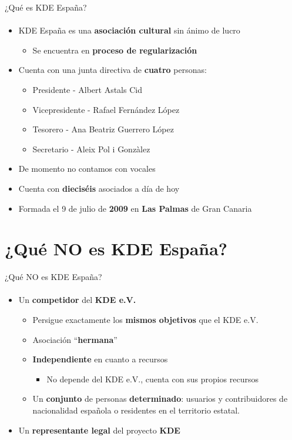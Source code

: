 \documentclass[12pt]{beamer}
\begin{document}
\begin{frame}{¿Qué es KDE España?}
  \framesubtitle{}
  \begin{itemize}
    \item KDE España es una \textbf{asociación cultural} sin ánimo de lucro
    \begin{itemize}
      \item Se encuentra en \textbf{proceso de regularización}
    \end{itemize}
    \item Cuenta con una junta directiva de \textbf{cuatro} personas:
    \begin{itemize}
      \item Presidente - Albert Astals Cid
      \item Vicepresidente - Rafael Fernández López
      \item Tesorero - Ana Beatriz Guerrero López
      \item Secretario - Aleix Pol i Gonzàlez
    \end{itemize}
    \item De momento no contamos con vocales
    \item Cuenta con \textbf{dieciséis} asociados a día de hoy
    \item Formada el 9 de julio de \textbf{2009} en \textbf{Las Palmas} de Gran Canaria
  \end{itemize}
\end{frame}

\section{¿Qué NO es KDE España?}

\begin{frame}{¿Qué NO es KDE España?}
  \framesubtitle{}
  \begin{itemize}
    \item Un \textbf{competidor} del \textbf{KDE e.V.}
    \begin{itemize}
      \item Persigue exactamente los \textbf{mismos objetivos} que el KDE e.V.
      \item Asociación ``\textbf{hermana}''
      \item \textbf{Independiente} en cuanto a recursos
      \begin{itemize}
        \item No depende del KDE e.V., cuenta con sus propios recursos
      \end{itemize}
      \item Un \textbf{conjunto} de personas \textbf{determinado}: usuarios y
            contribuidores de nacionalidad española o residentes en el territorio estatal.
    \end{itemize}
    \item Un \textbf{representante legal} del proyecto \textbf{KDE}
  \end{itemize}
\end{frame}
\end{document}
